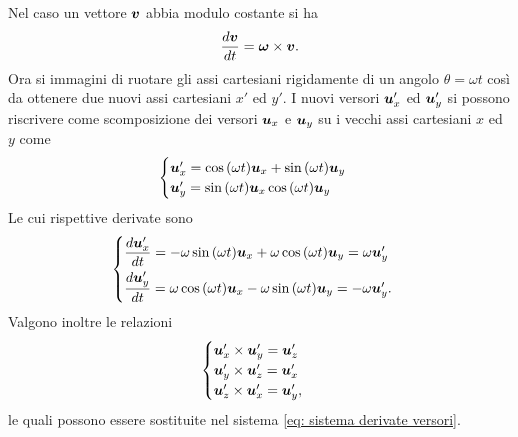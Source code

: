 Nel caso un vettore $\bm{v}$ abbia modulo costante si ha
\begin{equation}
    \frac{d\bm{v}}{dt}=\bm{\omega}\times\bm{v}.
\end{equation}
Ora si immagini di ruotare gli assi cartesiani rigidamente di un angolo $\theta=\omega t$ così da ottenere due nuovi assi cartesiani $x'$ ed $y'$.
I nuovi versori $\bm{u}'_x$ ed $\bm{u}'_y$ si possono riscrivere come scomposizione dei versori $\bm{u}_x$ e $\bm{u}_y$ su i  vecchi assi cartesiani $x$ ed $y$ come
\begin{equation}
    \begin{cases}
        \bm{u}'_x=\cos{(\omega t)}\bm{u}_x+\sin{(\omega t)}\bm{u}_y \\
        \bm{u}'_y=\sin{(\omega t)}\bm{u}_x\cos{(\omega t)}\bm{u}_y 
    \end{cases}
\end{equation}
Le cui rispettive derivate sono
\begin{equation}\label{eq: sistema derivate versori}
    \begin{cases}
        \dfrac{d\bm{u}'_x}{dt}=-\omega\sin{(\omega t)}\bm{u}_x+\omega\cos{(\omega t)}\bm{u}_y=\omega\bm{u}'_y \\[1.5ex]
        \dfrac{d\bm{u}'_y}{dt}=\omega\cos{(\omega t)}\bm{u}_x-\omega\sin{(\omega t)}\bm{u}_y=-\omega\bm{u}'_y.
    \end{cases}
\end{equation}
Valgono inoltre le relazioni
\begin{equation}
    \begin{cases}
        \bm{u}'_x\times\bm{u}'_y=\bm{u}'_z \\
        \bm{u}'_y\times\bm{u}'_z=\bm{u}'_x \\
        \bm{u}'_z\times\bm{u}'_x=\bm{u}'_y,
    \end{cases}
\end{equation}
le quali possono essere sostituite nel sistema \eqref{eq: sistema derivate versori}. 